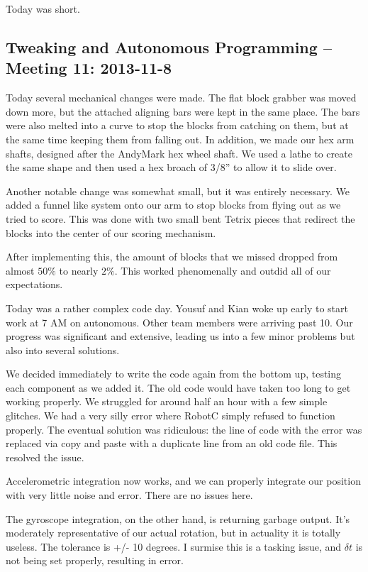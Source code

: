Today was short.

\newpage \subsection{Tweaking and Autonomous Programming -- Meeting 11: 2013-11-8}
Today several mechanical changes were made. The flat block grabber was moved down more, but the attached aligning bars were kept in the same place. The bars were also melted into a curve to stop the blocks from catching on them, but at the same time keeping them from falling out. In addition, we made our hex arm shafts, designed after the AndyMark hex wheel shaft. We used a lathe to create the same shape and then used a hex broach of 3/8'' to allow it to slide over. 

Another notable change was somewhat small, but it was entirely necessary. We added a funnel like system onto our arm to stop blocks from flying out as we tried to score. This was done with two small bent Tetrix pieces that redirect the blocks into the center of our scoring mechanism. 

After implementing this, the amount of blocks that we missed dropped from almost $50\%$ to nearly $2\%$. This worked phenomenally and outdid all of our expectations. 

Today was a rather complex code day. Yousuf and Kian woke up early to start work at 7 AM on autonomous. Other team members were arriving past 10. Our progress was significant and extensive, leading us into a few minor problems but also into several solutions. 

We decided immediately to write the code again from the bottom up, testing each component as we added it. The old code would have taken too long to get working properly. We struggled for around half an hour with a few simple glitches. We had a very silly error where RobotC simply refused to function properly. The eventual solution was ridiculous: the line of code with the error was replaced via copy and paste with a duplicate line from an old code file. This resolved the issue. 

Accelerometric integration now works, and we can properly integrate our position with very little noise and error. There are no issues here. 

The gyroscope integration, on the other hand, is returning garbage output. It's moderately representative of our actual rotation, but in actuality it is totally useless. The tolerance is +/- 10 degrees. I surmise this is a tasking issue, and $\delta t$ is not being set properly, resulting in error. 


